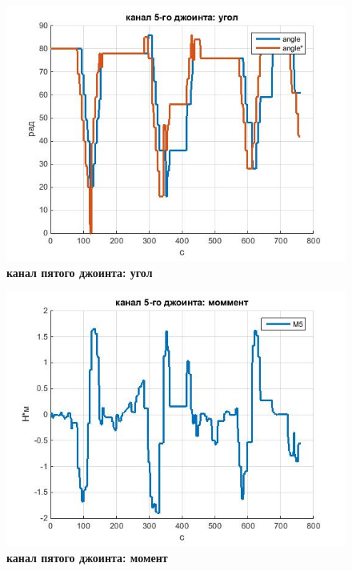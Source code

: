 \documentclass[a4paper,14pt,russian]{extreport} \usepackage{extsizes}
\begin{document}
			\begin{figure}[h!]
				\centering		 
				\includegraphics[width=5.5in]{./graph/j5.jpg}	
				\caption{
					\textbf{канал пятого джоинта: угол}
				}
				\label{fig_img52}
			\end{figure}
			\begin{figure}[h!]
				\centering		 
				\includegraphics[width=5.5in]{./graph/m5.jpg}	
				\caption{
					\textbf{канал пятого джоинта: момент}
				}
				\label{fig_img55}
			\end{figure}
\end{document}
